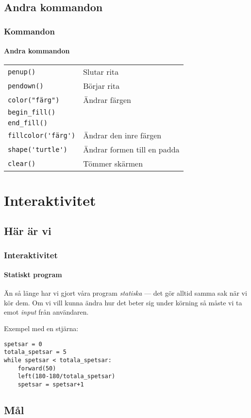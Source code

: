\documentclass[aspectratio=169]{beamer}
\begin{document}
\subsection{Andra kommandon}

\begin{frame}
	\frametitle{Kommandon}
	\framesubtitle{Andra kommandon}
	
	\begin{tabular}{ll}
		\lstinline{penup()} & Slutar rita\\
		\lstinline{pendown()} & Börjar rita\\
		\lstinline{color("färg")} & Ändrar färgen\\
		\lstinline{begin_fill()} & \\
		\lstinline{end_fill()} & \\
		\lstinline{fillcolor('färg')} & Ändrar den inre färgen\\
		\lstinline{shape('turtle')} & Ändrar formen till en padda\\
		\lstinline{clear()} & Tömmer skärmen
	\end{tabular}
	
\end{frame}

\section{Interaktivitet}

\subsection{Här är vi}

\begin{frame}[fragile]
	\frametitle{Interaktivitet}
	\framesubtitle{Statiskt program}
	
	Än så länge har vi gjort våra program \textit{statiska} --- det gör alltid samma sak när vi kör dem. Om vi vill kunna ändra hur det beter sig under körning så måste vi ta emot \textit{input} från användaren.
	
	Exempel med en stjärna:
	
	\begin{lstlisting}
spetsar = 0
totala_spetsar = 5
while spetsar < totala_spetsar:
    forward(50)
    left(180-180/totala_spetsar)
    spetsar = spetsar+1
	\end{lstlisting}
	
\end{frame}

\subsection{Mål}
\end{document}
